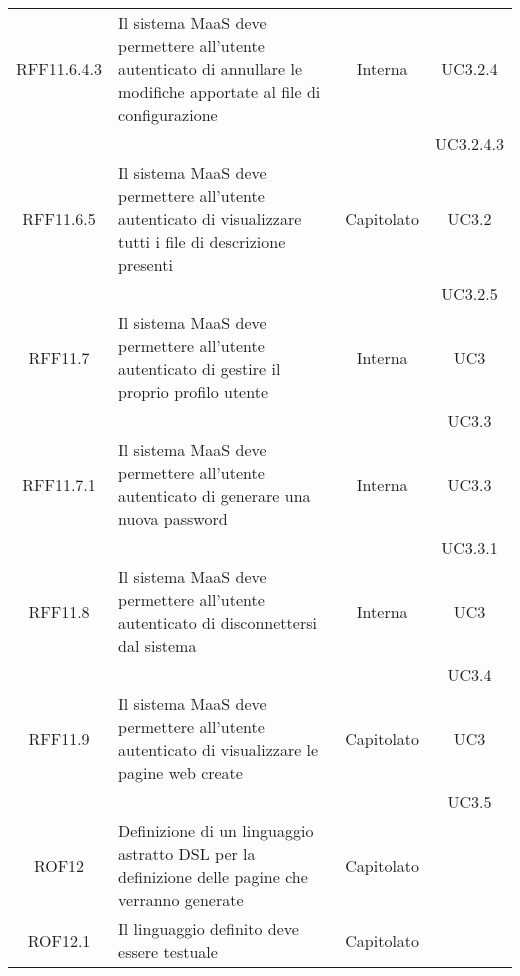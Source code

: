 \begin{longtable}{|c|p{6cm}|c|c|}
\midrule
RFF11.6.4.3
& Il sistema MaaS deve permettere all'utente autenticato di annullare le modifiche apportate al file di configurazione
& Interna
& UC3.2.4\\
& & & UC3.2.4.3\\

\midrule
RFF11.6.5
& Il sistema MaaS deve permettere all'utente autenticato di visualizzare tutti i file di descrizione presenti
& Capitolato
& UC3.2\\
& & & UC3.2.5\\

\midrule
RFF11.7
& Il sistema MaaS deve permettere all'utente autenticato di gestire il proprio profilo utente
& Interna
& UC3\\
& & & UC3.3\\

\midrule
RFF11.7.1
& Il sistema MaaS deve permettere all'utente autenticato di generare una nuova password
& Interna
& UC3.3\\
& & & UC3.3.1\\

\midrule
RFF11.8
& Il sistema MaaS deve permettere all'utente autenticato di disconnettersi dal sistema
& Interna
& UC3\\
& & & UC3.4\\

\midrule
RFF11.9
& Il sistema MaaS deve permettere all'utente autenticato di visualizzare le pagine web create
& Capitolato
& UC3\\
& & & UC3.5\\

\midrule
ROF12
& Definizione di un linguaggio astratto DSL per la definizione delle pagine che verranno generate
& Capitolato
&
\\

\midrule
ROF12.1
& Il linguaggio definito deve essere testuale
& Capitolato
&
\\

\end{longtable}
\newpage
